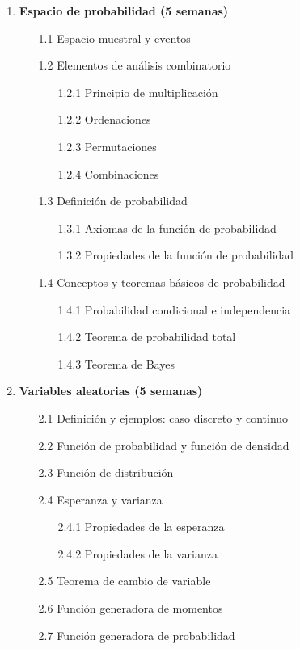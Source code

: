 \begin{enumerate}

\item \textbf{Espacio de probabilidad (5 semanas)}
\begin{enumerate}
  \item[1.1 ] Espacio muestral y eventos
  \item[1.2 ] Elementos de an\'alisis combinatorio
  \begin{enumerate}
    \item[1.2.1 ] Principio de multiplicaci\'on
    \item[1.2.2 ] Ordenaciones
    \item[1.2.3 ] Permutaciones
    \item[1.2.4 ] Combinaciones
  \end{enumerate}
  \item[1.3 ] Definici\'on de probabilidad
  \begin{enumerate}
    \item[1.3.1 ] Axiomas de la funci\'on de probabilidad
    \item[1.3.2 ] Propiedades de la funci\'on de probabilidad
  \end{enumerate}
  \item[1.4 ] Conceptos y teoremas b\'asicos de probabilidad
  \begin{enumerate}
    \item[1.4.1 ] Probabilidad condicional e independencia
    \item[1.4.2 ] Teorema de probabilidad total
    \item[1.4.3] Teorema de Bayes
  \end{enumerate}
\end{enumerate}

\item \textbf{Variables aleatorias (5 semanas)}
\begin{enumerate}
  \item[2.1 ] Definici\'on y ejemplos: caso discreto y continuo
  \item[2.2 ] Funci\'on de probabilidad y funci\'on de densidad
  \item[2.3 ] Funci\'on de distribuci\'on
  \item[2.4 ] Esperanza y varianza
  \begin{enumerate}
    \item[2.4.1 ] Propiedades de la esperanza
    \item[2.4.2 ] Propiedades de la varianza
  \end{enumerate}
  \item[2.5 ] Teorema de cambio de variable
  \item[2.6 ] Funci\'on generadora de momentos
  \item[2.7 ] Funci\'on generadora de probabilidad
\end{enumerate}


\end{enumerate}

